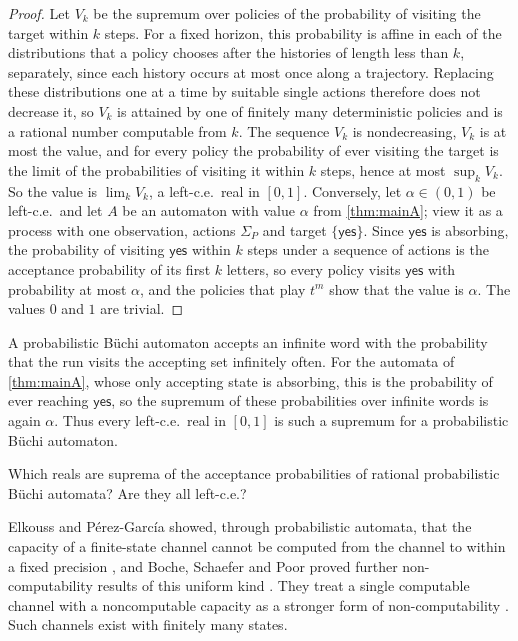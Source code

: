 \documentclass[11pt]{article}
\theoremstyle{plain}
\theoremstyle{definition}
\theoremstyle{remark}
\newcommand{\yes}{\mathsf{yes}}
\begin{document}
\begin{proof}
Let $V_k$ be the supremum over policies of the probability of visiting the target within $k$ steps. For a fixed horizon, this probability is affine in each of the distributions that a policy chooses after the histories of length less than $k$, separately, since each history occurs at most once along a trajectory. Replacing these distributions one at a time by suitable single actions therefore does not decrease it, so $V_k$ is attained by one of finitely many deterministic policies and is a rational number computable from $k$. The sequence $V_k$ is nondecreasing, $V_k$ is at most the value, and for every policy the probability of ever visiting the target is the limit of the probabilities of visiting it within $k$ steps, hence at most $\sup_kV_k$. So the value is $\lim_kV_k$, a left-c.e.\ real in $[0,1]$. Conversely, let $\alpha\in(0,1)$ be left-c.e.\ and let $A$ be an automaton with value $\alpha$ from \cref{thm:mainA}; view it as a process with one observation, actions $\Sigma_P$ and target $\{\yes\}$. Since $\yes$ is absorbing, the probability of visiting $\yes$ within $k$ steps under a sequence of actions is the acceptance probability of its first $k$ letters, so every policy visits $\yes$ with probability at most $\alpha$, and the policies that play $t^m$ show that the value is $\alpha$. The values $0$ and $1$ are trivial.
\end{proof}

A probabilistic B\"uchi automaton \cite{BBG08} accepts an infinite word with the probability that the run visits the accepting set infinitely often. For the automata of \cref{thm:mainA}, whose only accepting state is absorbing, this is the probability of ever reaching $\yes$, so the supremum of these probabilities over infinite words is again $\alpha$. Thus every left-c.e.\ real in $[0,1]$ is such a supremum for a probabilistic B\"uchi automaton.

\begin{question}
Which reals are suprema of the acceptance probabilities of rational probabilistic B\"uchi automata? Are they all left-c.e.?
\end{question}

Elkouss and P\'erez-Garc\'ia showed, through probabilistic automata, that the capacity of a finite-state channel cannot be computed from the channel to within a fixed precision \cite{EPG18}, and Boche, Schaefer and Poor proved further non-computability results of this uniform kind \cite{BSP20}. They treat a single computable channel with a noncomputable capacity as a stronger form of non-computability \cite[Remark~31]{BSP20}. Such channels exist with finitely many states.
\end{document}
